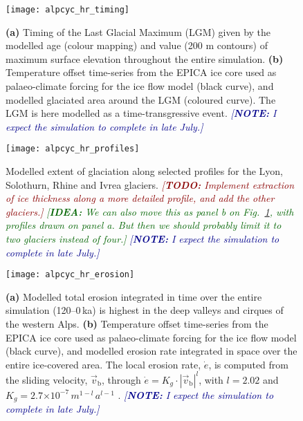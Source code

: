 \documentclass{article}
\newcommand{\idea}[1]{\textcolor{darkgreen}{\emph{[\textbf{IDEA:} #1]}}}
\newcommand{\note}[1]{\textcolor{darkblue}{\emph{[\textbf{NOTE:} #1]}}}
\newcommand{\todo}[1]{\textcolor{darkred}{\emph{[\textbf{TODO:} #1]}}}
\newcommand{\e}[1]{\ensuremath{\times 10^{#1}}}
\begin{document}
    \begin{figure}
      \centerline{\texttt{[image: alpcyc\_hr\_timing]}}
      \caption{%
        \textbf{(a)} Timing of the Last Glacial Maximum (LGM) given by the
        modelled age (colour mapping) and value (200 m contours) of maximum
        surface elevation throughout the entire simulation.
        \textbf{(b)} Temperature offset time-series from the EPICA ice core
        used as palaeo-climate forcing for the ice flow model (black curve),
        and modelled glaciated area around the LGM (coloured curve). The LGM
        is here modelled as a time-transgressive event.
        \note{I expect the simulation to complete in late July.}}
      \label{fig:timing}
    \end{figure}

    \begin{figure}
      \centerline{\texttt{[image: alpcyc\_hr\_profiles]}}
      \caption{%
        Modelled extent of glaciation along selected profiles for the Lyon,
        Solothurn, Rhine and Ivrea glaciers.
        \todo{Implement extraction of ice thickness along a more detailed
              profile, and add the other glaciers.}
        \idea{We can also move this as panel b on Fig.~\ref{fig:timing}, with
              profiles drawn on panel a. But then we should probably limit it
              to two glaciers instead of four.}
        \note{I expect the simulation to complete in late July.}}
      \label{fig:profiles}
    \end{figure}

    \begin{figure}
      \centerline{\texttt{[image: alpcyc\_hr\_erosion]}}
      \caption{%
        \textbf{(a)} Modelled total erosion integrated in time over the entire
        simulation (120--0\,ka) is highest in the deep valleys and cirques of
        the western Alps.
        \textbf{(b)} Temperature offset time-series from the EPICA ice core
        used as palaeo-climate forcing for the ice flow model (black curve),
        and modelled erosion rate integrated in space over the entire
        ice-covered area. The local erosion rate, $\dot{e}$, is computed from
        the sliding velocity, $\vec{v}_{\mathrm{b}}$, through
        $\dot{e} = K_g \cdot |\vec{v}_{\mathrm{b}}|^{l}$, with
        $l = 2.02$ and $K_g = 2.7\e{-7}\,m^{1-l}\,a^{l-1}$
        \citep{Herman.etal.2015}.
        \note{I expect the simulation to complete in late July.}}
      \label{fig:erosion}
    \end{figure}
\end{document}
